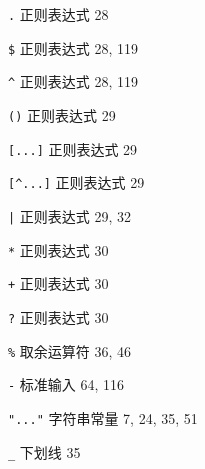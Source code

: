 \begin{multicols}{2}
\verb'.' 正则表达式 28 

\verb'$' 正则表达式 28, 119 

\verb'^' 正则表达式 28, 119 

\verb'()' 正则表达式 29 

\verb'[...]' 正则表达式 29 

\verb'[^...]' 正则表达式 29 

\verb'|' 正则表达式 29, 32

\verb'*' 正则表达式 30

\verb'+' 正则表达式 30 

\verb'?' 正则表达式 30 

\verb'%' 取余运算符 36, 46 

\verb'-' 标准输入 64, 116

\verb'"..."' 字符串常量 7, 24, 35, 51 

\verb'_' 下划线 35

\end{multicols}
